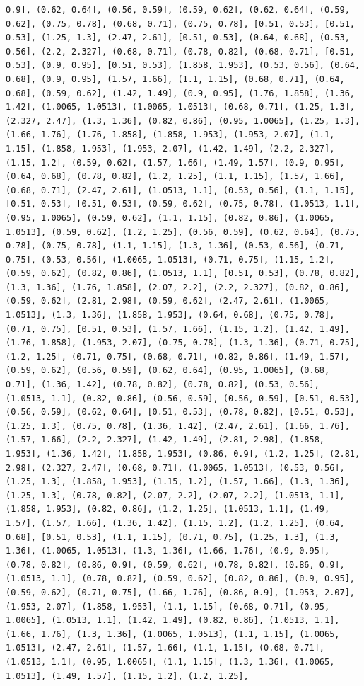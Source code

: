 \documentclass[12pt,fleqn]{article}\usepackage{../common}
\begin{document}
\begin{verbatim}
0.9], (0.62, 0.64], (0.56, 0.59], (0.59, 0.62], (0.62, 0.64], (0.59, 0.62], (0.75, 0.78], (0.68, 0.71], (0.75, 0.78], [0.51, 0.53], [0.51, 0.53], (1.25, 1.3], (2.47, 2.61], [0.51, 0.53], (0.64, 0.68], (0.53, 0.56], (2.2, 2.327], (0.68, 0.71], (0.78, 0.82], (0.68, 0.71], [0.51, 0.53], (0.9, 0.95], [0.51, 0.53], (1.858, 1.953], (0.53, 0.56], (0.64, 0.68], (0.9, 0.95], (1.57, 1.66], (1.1, 1.15], (0.68, 0.71], (0.64, 0.68], (0.59, 0.62], (1.42, 1.49], (0.9, 0.95], (1.76, 1.858], (1.36, 1.42], (1.0065, 1.0513], (1.0065, 1.0513], (0.68, 0.71], (1.25, 1.3], (2.327, 2.47], (1.3, 1.36], (0.82, 0.86], (0.95, 1.0065], (1.25, 1.3], (1.66, 1.76], (1.76, 1.858], (1.858, 1.953], (1.953, 2.07], (1.1, 1.15], (1.858, 1.953], (1.953, 2.07], (1.42, 1.49], (2.2, 2.327], (1.15, 1.2], (0.59, 0.62], (1.57, 1.66], (1.49, 1.57], (0.9, 0.95], (0.64, 0.68], (0.78, 0.82], (1.2, 1.25], (1.1, 1.15], (1.57, 1.66], (0.68, 0.71], (2.47, 2.61], (1.0513, 1.1], (0.53, 0.56], (1.1, 1.15], [0.51, 0.53], [0.51, 0.53], (0.59, 0.62], (0.75, 0.78], (1.0513, 1.1], (0.95, 1.0065], (0.59, 0.62], (1.1, 1.15], (0.82, 0.86], (1.0065, 1.0513], (0.59, 0.62], (1.2, 1.25], (0.56, 0.59], (0.62, 0.64], (0.75, 0.78], (0.75, 0.78], (1.1, 1.15], (1.3, 1.36], (0.53, 0.56], (0.71, 0.75], (0.53, 0.56], (1.0065, 1.0513], (0.71, 0.75], (1.15, 1.2], (0.59, 0.62], (0.82, 0.86], (1.0513, 1.1], [0.51, 0.53], (0.78, 0.82], (1.3, 1.36], (1.76, 1.858], (2.07, 2.2], (2.2, 2.327], (0.82, 0.86], (0.59, 0.62], (2.81, 2.98], (0.59, 0.62], (2.47, 2.61], (1.0065, 1.0513], (1.3, 1.36], (1.858, 1.953], (0.64, 0.68], (0.75, 0.78], (0.71, 0.75], [0.51, 0.53], (1.57, 1.66], (1.15, 1.2], (1.42, 1.49], (1.76, 1.858], (1.953, 2.07], (0.75, 0.78], (1.3, 1.36], (0.71, 0.75], (1.2, 1.25], (0.71, 0.75], (0.68, 0.71], (0.82, 0.86], (1.49, 1.57], (0.59, 0.62], (0.56, 0.59], (0.62, 0.64], (0.95, 1.0065], (0.68, 0.71], (1.36, 1.42], (0.78, 0.82], (0.78, 0.82], (0.53, 0.56], (1.0513, 1.1], (0.82, 0.86], (0.56, 0.59], (0.56, 0.59], [0.51, 0.53], (0.56, 0.59], (0.62, 0.64], [0.51, 0.53], (0.78, 0.82], [0.51, 0.53], (1.25, 1.3], (0.75, 0.78], (1.36, 1.42], (2.47, 2.61], (1.66, 1.76], (1.57, 1.66], (2.2, 2.327], (1.42, 1.49], (2.81, 2.98], (1.858, 1.953], (1.36, 1.42], (1.858, 1.953], (0.86, 0.9], (1.2, 1.25], (2.81, 2.98], (2.327, 2.47], (0.68, 0.71], (1.0065, 1.0513], (0.53, 0.56], (1.25, 1.3], (1.858, 1.953], (1.15, 1.2], (1.57, 1.66], (1.3, 1.36], (1.25, 1.3], (0.78, 0.82], (2.07, 2.2], (2.07, 2.2], (1.0513, 1.1], (1.858, 1.953], (0.82, 0.86], (1.2, 1.25], (1.0513, 1.1], (1.49, 1.57], (1.57, 1.66], (1.36, 1.42], (1.15, 1.2], (1.2, 1.25], (0.64, 0.68], [0.51, 0.53], (1.1, 1.15], (0.71, 0.75], (1.25, 1.3], (1.3, 1.36], (1.0065, 1.0513], (1.3, 1.36], (1.66, 1.76], (0.9, 0.95], (0.78, 0.82], (0.86, 0.9], (0.59, 0.62], (0.78, 0.82], (0.86, 0.9], (1.0513, 1.1], (0.78, 0.82], (0.59, 0.62], (0.82, 0.86], (0.9, 0.95], (0.59, 0.62], (0.71, 0.75], (1.66, 1.76], (0.86, 0.9], (1.953, 2.07], (1.953, 2.07], (1.858, 1.953], (1.1, 1.15], (0.68, 0.71], (0.95, 1.0065], (1.0513, 1.1], (1.42, 1.49], (0.82, 0.86], (1.0513, 1.1], (1.66, 1.76], (1.3, 1.36], (1.0065, 1.0513], (1.1, 1.15], (1.0065, 1.0513], (2.47, 2.61], (1.57, 1.66], (1.1, 1.15], (0.68, 0.71], (1.0513, 1.1], (0.95, 1.0065], (1.1, 1.15], (1.3, 1.36], (1.0065, 1.0513], (1.49, 1.57], (1.15, 1.2], (1.2, 1.25], 
\end{verbatim}
\end{document}
